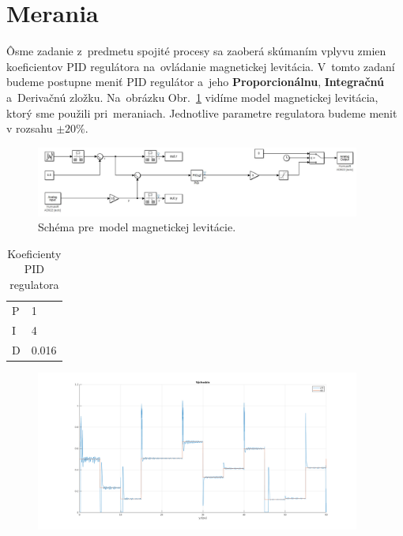 \documentclass{article}
\begin{document}
\clearpage

\section{Merania}
\label{sec:merania}

Ôsme zadanie z~predmetu spojité procesy sa zaoberá skúmaním vplyvu zmien koeficientov PID regulátora
na~ovládanie magnetickej levitácia. V~tomto zadaní budeme postupne meniť PID regulátor a~jeho \textbf{Proporcionálnu},
\textbf{Integračnú} a~Derivačnú zložku. Na~obrázku Obr.~\ref{fig:schema} vidíme model magnetickej levitácia,
ktorý sme použili pri~meraniach. Jednotlive parametre regulatora budeme menit v rozsahu $\pm20\%$.

\begin{figure}[!htbp]
	\begin{center}
		\includegraphics[width=0.95\textwidth]{include/schema.png}
	\end{center}
	\caption{Schéma pre~model magnetickej levitácie.}
	\label{fig:schema}
\end{figure}

\begin{table}[!htbp]
	\caption{Koeficienty PID regulatora}
	\label{tab:t0}
	\begin{center}
		\begin{tabular}[c]{|l|l|}
			\hline

			P & 1 \\
			I & 4 \\
			D & 0.016 \\
			\hline
		\end{tabular}
	\end{center}
\end{table}

\begin{figure}
	\begin{center}
		\includegraphics[width=0.95\textwidth]{include/m1.png}
	\end{center}
	\caption{}
	\label{fig:}
\end{figure}
\end{document}
